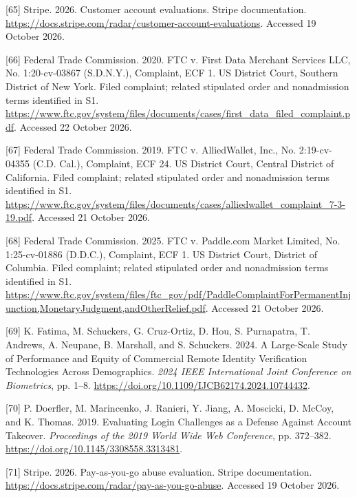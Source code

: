 \documentclass[acmlarge,nonacm]{acmart}
\newlength{\cslhangindent}
\newlength{\cslentryspacingunit} %
\newenvironment{CSLReferences}[2] %
 {\bibliofont %
  \setlength{\parindent}{0pt}
  \ifodd #1
  \let\oldpar\par
  \def\par{\hangindent=\cslhangindent\oldpar}
  \fi
  \setlength{\parskip}{#2\cslentryspacingunit}
 }%
 {}
\begin{document}
\begin{CSLReferences}{1}{1}
\leavevmode{}%
{[}65{]} Stripe. 2026. Customer account evaluations. Stripe
documentation.
\url{https://docs.stripe.com/radar/customer-account-evaluations}.
Accessed 19 October 2026.

\leavevmode{}%
{[}66{]} Federal Trade Commission. 2020. FTC v. First Data Merchant
Services LLC, No. 1:20-cv-03867 (S.D.N.Y.), Complaint, ECF 1. US
District Court, Southern District of New York. Filed complaint; related
stipulated order and nonadmission terms identified in S1.
\url{https://www.ftc.gov/system/files/documents/cases/first_data_filed_complaint.pdf}.
Accessed 22 October 2026.

\leavevmode{}%
{[}67{]} Federal Trade Commission. 2019. FTC v. AlliedWallet, Inc., No.
2:19-cv-04355 (C.D. Cal.), Complaint, ECF 24. US District Court, Central
District of California. Filed complaint; related stipulated order and
nonadmission terms identified in S1.
\url{https://www.ftc.gov/system/files/documents/cases/alliedwallet_complaint_7-3-19.pdf}.
Accessed 21 October 2026.

\leavevmode{}%
{[}68{]} Federal Trade Commission. 2025. FTC v. Paddle.com Market
Limited, No. 1:25-cv-01886 (D.D.C.), Complaint, ECF 1. US District
Court, District of Columbia. Filed complaint; related stipulated order
and nonadmission terms identified in S1.
\url{https://www.ftc.gov/system/files/ftc_gov/pdf/PaddleComplaintForPermanentInjunction,MonetaryJudgment,andOtherRelief.pdf}.
Accessed 21 October 2026.

\leavevmode{}%
{[}69{]} K. Fatima, M. Schuckers, G. Cruz-Ortiz, D. Hou, S. Purnapatra,
T. Andrews, A. Neupane, B. Marshall, and S. Schuckers. 2024. A
Large-Scale Study of Performance and Equity of Commercial Remote
Identity Verification Technologies Across Demographics. \emph{2024 IEEE
International Joint Conference on Biometrics}, pp. 1--8.
\url{https://doi.org/10.1109/IJCB62174.2024.10744432}.

\leavevmode{}%
{[}70{]} P. Doerfler, M. Marincenko, J. Ranieri, Y. Jiang, A. Moscicki,
D. McCoy, and K. Thomas. 2019. Evaluating Login Challenges as a Defense
Against Account Takeover. \emph{Proceedings of the 2019 World Wide Web
Conference}, pp. 372--382.
\url{https://doi.org/10.1145/3308558.3313481}.

\leavevmode{}%
{[}71{]} Stripe. 2026. Pay-as-you-go abuse evaluation. Stripe
documentation. \url{https://docs.stripe.com/radar/pay-as-you-go-abuse}.
Accessed 19 October 2026.


\end{CSLReferences}
\end{document}
